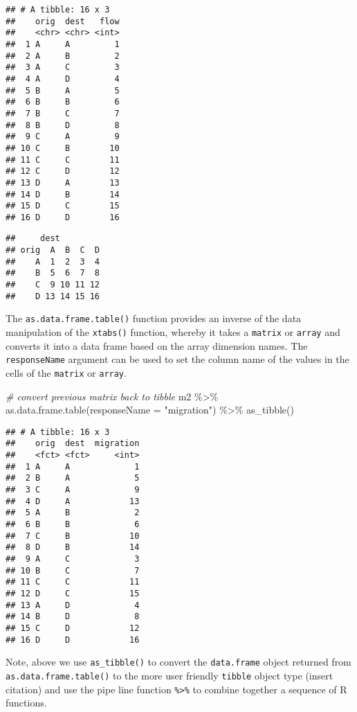 \documentclass[
]{book}
\newenvironment{Shaded}{\begin{snugshade}}{\end{snugshade}}
\newcommand{\AttributeTok}[1]{\textcolor[rgb]{0.77,0.63,0.00}{#1}}
\newcommand{\CommentTok}[1]{\textcolor[rgb]{0.56,0.35,0.01}{\textit{#1}}}
\newcommand{\FunctionTok}[1]{\textcolor[rgb]{0.00,0.00,0.00}{#1}}
\newcommand{\NormalTok}[1]{#1}
\newcommand{\SpecialCharTok}[1]{\textcolor[rgb]{0.00,0.00,0.00}{#1}}
\newcommand{\StringTok}[1]{\textcolor[rgb]{0.31,0.60,0.02}{#1}}
\begin{document}
\begin{verbatim}
## # A tibble: 16 x 3
##    orig  dest   flow
##    <chr> <chr> <int>
##  1 A     A         1
##  2 A     B         2
##  3 A     C         3
##  4 A     D         4
##  5 B     A         5
##  6 B     B         6
##  7 B     C         7
##  8 B     D         8
##  9 C     A         9
## 10 C     B        10
## 11 C     C        11
## 12 C     D        12
## 13 D     A        13
## 14 D     B        14
## 15 D     C        15
## 16 D     D        16
\end{verbatim}

\begin{verbatim}
##     dest
## orig  A  B  C  D
##    A  1  2  3  4
##    B  5  6  7  8
##    C  9 10 11 12
##    D 13 14 15 16
\end{verbatim}

The \texttt{as.data.frame.table()} function provides an inverse of the data manipulation of the \texttt{xtabs()} function, whereby it takes a \texttt{matrix} or \texttt{array} and converts it into a data frame based on the array dimension names. The \texttt{responseName} argument can be used to set the column name of the values in the cells of the \texttt{matrix} or \texttt{array}.

\begin{Shaded}
\begin{Highlighting}[]
\CommentTok{\# convert previous matrix back to tibble}
\NormalTok{m2 }\SpecialCharTok{\%\textgreater{}\%}
  \FunctionTok{as.data.frame.table}\NormalTok{(}\AttributeTok{responseName =} \StringTok{"migration"}\NormalTok{) }\SpecialCharTok{\%\textgreater{}\%}
  \FunctionTok{as\_tibble}\NormalTok{()}
\end{Highlighting}
\end{Shaded}

\begin{verbatim}
## # A tibble: 16 x 3
##    orig  dest  migration
##    <fct> <fct>     <int>
##  1 A     A             1
##  2 B     A             5
##  3 C     A             9
##  4 D     A            13
##  5 A     B             2
##  6 B     B             6
##  7 C     B            10
##  8 D     B            14
##  9 A     C             3
## 10 B     C             7
## 11 C     C            11
## 12 D     C            15
## 13 A     D             4
## 14 B     D             8
## 15 C     D            12
## 16 D     D            16
\end{verbatim}

Note, above we use \texttt{as\_tibble()} to convert the \texttt{data.frame} object returned from \texttt{as.data.frame.table()} to the more user friendly \texttt{tibble} object type (insert citation) and use the pipe line function \texttt{\%\textgreater{}\%} to combine together a sequence of R functions.
\end{document}
